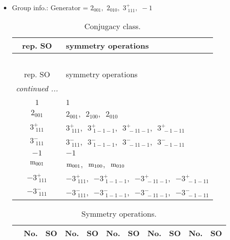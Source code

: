 \documentclass[fleqn,10pt,landscape]{article}
\begin{document}
\begin{itemize}
\item Group info.: Generator = $2{}_{001},\,\,2{}_{010},\,\,3^{+}_{\,\,111},\,\,-1$

\begin{center}
\renewcommand{\arraystretch}{1.3}
\begin{longtable}{c|l}
\caption{Conjugacy class.}
 \\
 \hline \hline
rep. SO & symmetry operations \\ \hline \endfirsthead

\multicolumn{1}{l}{\tablename\ \thetable{}} \\
 \hline \hline
rep. SO & symmetry operations \\ \hline \endhead

 \hline \hline
\multicolumn{1}{r}{\footnotesize\it continued ...} \\ \endfoot

 \hline \hline
\multicolumn{1}{r}{} \\ \endlastfoot

$1$ & $1$ \\ \hline
$2{}_{001}$ & $2{}_{001}$,\,\, $2{}_{100}$,\,\, $2{}_{010}$ \\ \hline
$3^{+}_{\,\,111}$ & $3^{+}_{\,\,111}$,\,\, $3^{+}_{\,\,1-1-1}$,\,\, $3^{+}_{\,\,-11-1}$,\,\, $3^{+}_{\,\,-1-11}$ \\ \hline
$3^{-}_{\,\,111}$ & $3^{-}_{\,\,111}$,\,\, $3^{-}_{\,\,1-1-1}$,\,\, $3^{-}_{\,\,-11-1}$,\,\, $3^{-}_{\,\,-1-11}$ \\ \hline
$-1$ & $-1$ \\ \hline
${\rm m}_{001}$ & ${\rm m}_{001}$,\,\, ${\rm m}_{100}$,\,\, ${\rm m}_{010}$ \\ \hline
$-3^{+}_{\,\,111}$ & $-3^{+}_{\,\,111}$,\,\, $-3^{+}_{\,\,1-1-1}$,\,\, $-3^{+}_{\,\,-11-1}$,\,\, $-3^{+}_{\,\,-1-11}$ \\ \hline
$-3^{-}_{\,\,111}$ & $-3^{-}_{\,\,111}$,\,\, $-3^{-}_{\,\,1-1-1}$,\,\, $-3^{-}_{\,\,-11-1}$,\,\, $-3^{-}_{\,\,-1-11}$ \\
\end{longtable}
\end{center}
\begin{center}
\renewcommand{\arraystretch}{1.3}
\begin{longtable}{c|cc|cc|cc|cc|cc}
\caption{Symmetry operations.}
 \\
 \hline \hline
 & No. & SO & No. & SO & No. & SO & No. & SO & No. & SO \\ \hline \endfirsthead


\end{longtable}
\end{center}
\end{itemize}
\end{document}
